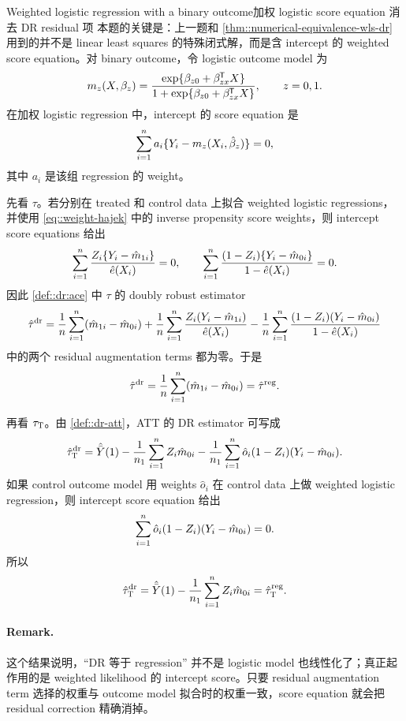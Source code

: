 \begin{exercisesolution}{Weighted logistic regression with a binary outcome}{加权 logistic score equation 消去 DR residual 项}
本题的关键是：上一题和 \cref{thm::numerical-equivalence-wls-dr} 用到的并不是 linear least squares 的特殊闭式解，而是含 intercept 的 weighted score equation。对 binary outcome，令 logistic outcome model 为
\[
m_z(X,\beta_z)=\frac{\exp\{\beta_{z0}+\beta_{zx}^{\mkern-1.5mu\mathsf{T}} X\}}
{1+\exp\{\beta_{z0}+\beta_{zx}^{\mkern-1.5mu\mathsf{T}} X\}},
\qquad z=0,1.
\]
在加权 logistic regression 中，intercept 的 score equation 是
\[
\sum_{i=1}^n a_i\{Y_i-m_z(X_i,\hat\beta_z)\}=0,
\]
其中 $a_i$ 是该组 regression 的 weight。

先看 $\tau$。若分别在 treated 和 control data 上拟合 weighted logistic regressions，并使用 \cref{eq::weight-hajek} 中的 inverse propensity score weights，则 intercept score equations 给出
\[
\sum_{i=1}^n \frac{Z_i\{Y_i-\hat m_{1i}\}}{\hat e(X_i)}=0,\qquad
\sum_{i=1}^n \frac{(1-Z_i)\{Y_i-\hat m_{0i}\}}{1-\hat e(X_i)}=0.
\]
因此 \cref{def::dr:ace} 中 $\tau$ 的 doubly robust estimator
\[
\hat\tau^{\textup{dr}}
=\frac{1}{n}\sum_{i=1}^n(\hat m_{1i}-\hat m_{0i})
 +\frac{1}{n}\sum_{i=1}^n \frac{Z_i(Y_i-\hat m_{1i})}{\hat e(X_i)}
 -\frac{1}{n}\sum_{i=1}^n
   \frac{(1-Z_i)(Y_i-\hat m_{0i})}{1-\hat e(X_i)}
\]
中的两个 residual augmentation terms 都为零。于是
\[
\hat\tau^{\textup{dr}}
=\frac{1}{n}\sum_{i=1}^n(\hat m_{1i}-\hat m_{0i})
=\hat\tau^{\textup{reg}}.
\]

再看 $\tau_\textsc{T}$。由 \cref{def::dr-att}，ATT 的 DR estimator 可写成
\[
\hat\tau_\textsc{T}^{\textup{dr}}
=\hat{\bar Y}(1)
-\frac{1}{n_1}\sum_{i=1}^n Z_i\hat m_{0i}
-\frac{1}{n_1}\sum_{i=1}^n \hat o_i(1-Z_i)(Y_i-\hat m_{0i}).
\]
如果 control outcome model 用 weights $\hat o_i$ 在 control data 上做 weighted logistic regression，则 intercept score equation 给出
\[
\sum_{i=1}^n \hat o_i(1-Z_i)(Y_i-\hat m_{0i})=0.
\]
所以
\[
\hat\tau_\textsc{T}^{\textup{dr}}
=\hat{\bar Y}(1)-\frac{1}{n_1}\sum_{i=1}^n Z_i\hat m_{0i}
=\hat\tau_\textsc{T}^{\textup{reg}}.
\]

\paragraph{Remark.}
这个结果说明，``DR 等于 regression'' 并不是 logistic model 也线性化了；真正起作用的是 weighted likelihood 的 intercept score。只要 residual augmentation term 选择的权重与 outcome model 拟合时的权重一致，score equation 就会把 residual correction 精确消掉。
\end{exercisesolution}

